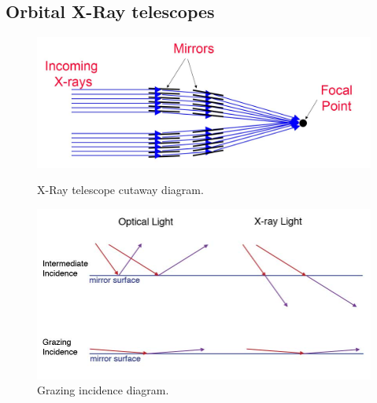 \documentclass[12pt, oneside]{smuthesis}
\begin{document}
\newpage

\subsection{\sc Orbital X-Ray telescopes} \label{xrayTelesopes}

\begin{figure}
	\centering
	\begin{minipage}{0.45\textwidth}
		\centering
		\includegraphics[width=\linewidth]{xrayTelescopeMultimirror}
		\caption{X-Ray telescope cutaway diagram.}
		\label{fig:xrayMultiMirror}
	\end{minipage}
	\begin{minipage}{0.45\textwidth}
		\centering
		\includegraphics[width=\linewidth]{grazingIncidence}
		\caption{Grazing incidence diagram.}
		\label{fig:grazingIncidence}
	\end{minipage}
\end{figure}
\end{document}
